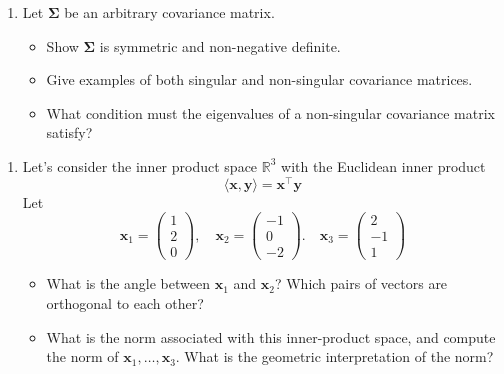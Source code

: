 \documentclass[]{book}
\providecommand{\tightlist}{%
  \setlength{\itemsep}{0pt}\setlength{\parskip}{0pt}}
\theoremstyle{definition}
\theoremstyle{definition}
\theoremstyle{definition}
\theoremstyle{remark}
\begin{document}
\begin{enumerate}
\def\labelenumi{\arabic{enumi}.}
\setcounter{enumi}{2}
\tightlist
\item
  Let \(\boldsymbol \Sigma\) be an arbitrary covariance matrix.

  \begin{itemize}
  \tightlist
  \item
    Show \(\boldsymbol \Sigma\) is symmetric and
    non-negative definite.
  \item
    Give examples of both singular and non-singular covariance matrices.\\
  \item
    What condition must the eigenvalues of a non-singular covariance matrix satisfy?
  \end{itemize}
\end{enumerate}

\begin{enumerate}
\def\labelenumi{\arabic{enumi}.}
\setcounter{enumi}{3}
\item
  Let's consider the inner product space \(\mathbb{R}^3\) with the Euclidean inner product
  \[\langle \boldsymbol x, \boldsymbol y\rangle = \boldsymbol x^\top \boldsymbol y\]
  Let
  \[\boldsymbol x_1 = \left(\begin{array}{c}1\\2\\0\end{array}\right), \quad \boldsymbol x_2 = \left(\begin{array}{c}-1\\0\\-2\end{array}\right). \quad \boldsymbol x_3 = \left(\begin{array}{c}2\\-1\\1\end{array}\right)
    \]

  \begin{itemize}
  \tightlist
  \item
    What is the angle between \(\boldsymbol x_1\) and \(\boldsymbol x_2\)? Which pairs of vectors are orthogonal to each other?
  \item
    What is the norm associated with this inner-product space, and compute the norm of \(\boldsymbol x_1, \ldots, \boldsymbol x_3\). What is the geometric interpretation of the norm?
  \end{itemize}
\end{enumerate}
\end{document}
